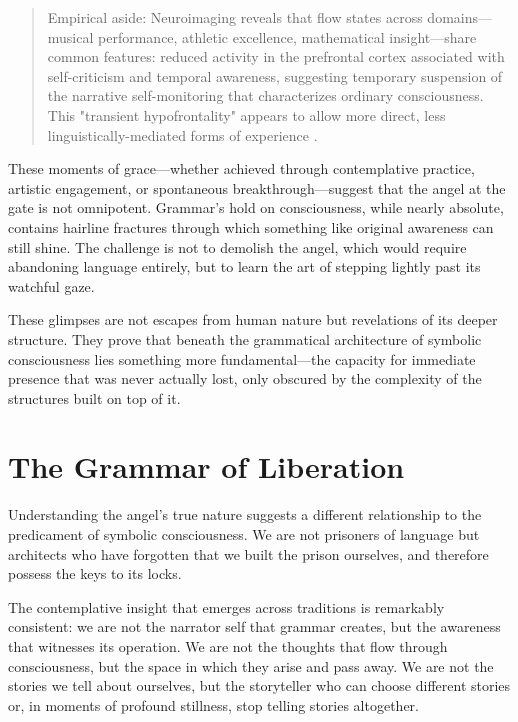 \begin{quote}\small
Empirical aside: Neuroimaging reveals that flow states across domains—musical performance, athletic excellence, mathematical insight—share common features: reduced activity in the prefrontal cortex associated with self-criticism and temporal awareness, suggesting temporary suspension of the narrative self-monitoring that characterizes ordinary consciousness. This "transient hypofrontality" appears to allow more direct, less linguistically-mediated forms of experience \parencite{dietrich2004neurocognitive,limb2008neural}.
\end{quote}

These moments of grace—whether achieved through contemplative practice, artistic engagement, or spontaneous breakthrough—suggest that the angel at the gate is not omnipotent. Grammar's hold on consciousness, while nearly absolute, contains hairline fractures through which something like original awareness can still shine. The challenge is not to demolish the angel, which would require abandoning language entirely, but to learn the art of stepping lightly past its watchful gaze.

These glimpses are not escapes from human nature but revelations of its deeper structure. They prove that beneath the grammatical architecture of symbolic consciousness lies something more fundamental—the capacity for immediate presence that was never actually lost, only obscured by the complexity of the structures built on top of it.

\section{The Grammar of Liberation}

Understanding the angel's true nature suggests a different relationship to the predicament of symbolic consciousness. We are not prisoners of language but architects who have forgotten that we built the prison ourselves, and therefore possess the keys to its locks.

The contemplative insight that emerges across traditions is remarkably consistent: we are not the narrator self that grammar creates, but the awareness that witnesses its operation. We are not the thoughts that flow through consciousness, but the space in which they arise and pass away. We are not the stories we tell about ourselves, but the storyteller who can choose different stories or, in moments of profound stillness, stop telling stories altogether.

